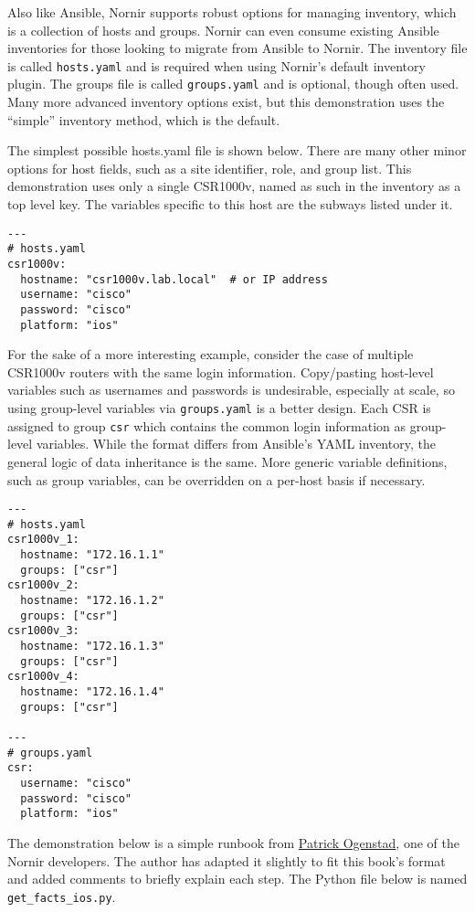 Also like Ansible, Nornir supports robust options for managing inventory,
which is a collection of hosts and groups. Nornir can even consume existing
Ansible inventories for those looking to migrate from Ansible to Nornir. The
inventory file is called \verb|hosts.yaml| and is required when using Nornir's
default inventory plugin. The groups file is called \verb|groups.yaml| and is
optional, though often used. Many more advanced inventory options exist, but
this demonstration uses the ``simple'' inventory method, which is the default.

The simplest possible hosts.yaml file is shown below. There are many other
minor options for host fields, such as a site identifier, role, and group
list. This demonstration uses only a single CSR1000v, named as such in the
inventory as a top level key. The variables specific to this host are the
subways listed under it.

\begin{verbatim}
---
# hosts.yaml
csr1000v:
  hostname: "csr1000v.lab.local"  # or IP address
  username: "cisco"
  password: "cisco"
  platform: "ios"
\end{verbatim}

For the sake of a more interesting example, consider the case of multiple
CSR1000v routers with the same login information. Copy/pasting host-level
variables such as usernames and passwords is undesirable, especially at scale,
so using group-level variables via \verb|groups.yaml| is a better design. Each
CSR is assigned to group \verb|csr| which contains the common login
information as group-level variables. While the format differs from Ansible's
YAML inventory, the general logic of data inheritance is the same. More
generic variable definitions, such as group variables, can be overridden on a
per-host basis if necessary.

\begin{verbatim}
---
# hosts.yaml
csr1000v_1:
  hostname: "172.16.1.1"
  groups: ["csr"]
csr1000v_2:
  hostname: "172.16.1.2"
  groups: ["csr"]
csr1000v_3:
  hostname: "172.16.1.3"
  groups: ["csr"]
csr1000v_4:
  hostname: "172.16.1.4"
  groups: ["csr"]

---
# groups.yaml
csr:
  username: "cisco"
  password: "cisco"
  platform: "ios"
\end{verbatim}

The demonstration below is a simple runbook from
\href{https://twitter.com/networklore}{Patrick Ogenstad}, one of the Nornir
developers. The author has adapted it slightly to fit this book's format and
added comments to briefly explain each step. The Python file below is
named \verb|get_facts_ios.py|.

